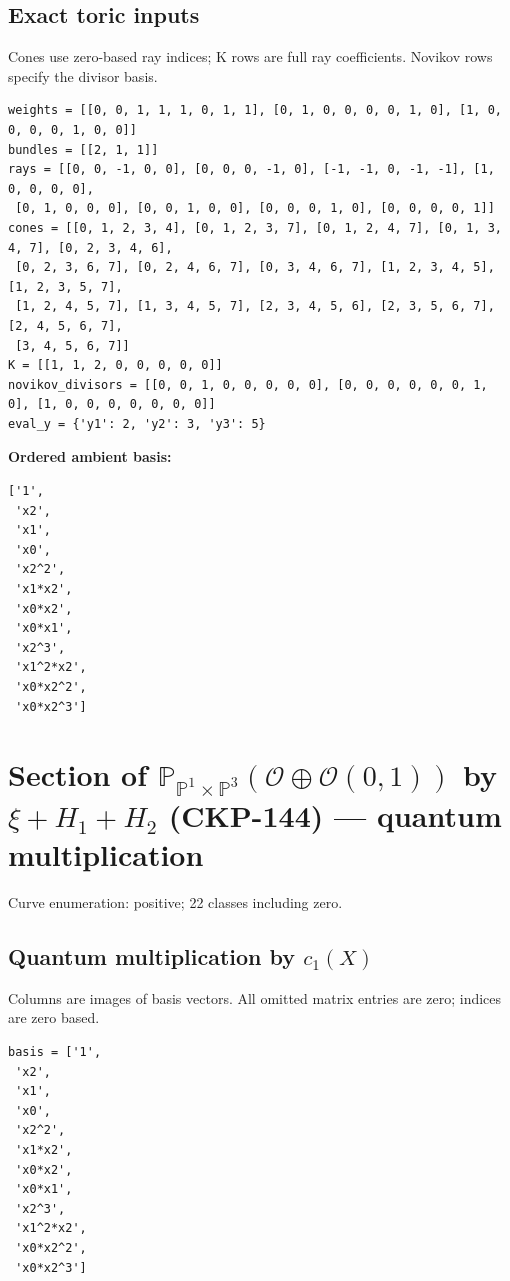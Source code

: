 \documentclass[10pt,a4paper]{article}
\begin{document}
\subsection*{Exact toric inputs}
Cones use zero-based ray indices; K rows are full ray coefficients. Novikov rows specify the divisor basis.

\begin{lstlisting}
weights = [[0, 0, 1, 1, 1, 0, 1, 1], [0, 1, 0, 0, 0, 0, 1, 0], [1, 0, 0, 0, 0, 1, 0, 0]]
bundles = [[2, 1, 1]]
rays = [[0, 0, -1, 0, 0], [0, 0, 0, -1, 0], [-1, -1, 0, -1, -1], [1, 0, 0, 0, 0],
 [0, 1, 0, 0, 0], [0, 0, 1, 0, 0], [0, 0, 0, 1, 0], [0, 0, 0, 0, 1]]
cones = [[0, 1, 2, 3, 4], [0, 1, 2, 3, 7], [0, 1, 2, 4, 7], [0, 1, 3, 4, 7], [0, 2, 3, 4, 6],
 [0, 2, 3, 6, 7], [0, 2, 4, 6, 7], [0, 3, 4, 6, 7], [1, 2, 3, 4, 5], [1, 2, 3, 5, 7],
 [1, 2, 4, 5, 7], [1, 3, 4, 5, 7], [2, 3, 4, 5, 6], [2, 3, 5, 6, 7], [2, 4, 5, 6, 7],
 [3, 4, 5, 6, 7]]
K = [[1, 1, 2, 0, 0, 0, 0, 0]]
novikov_divisors = [[0, 0, 1, 0, 0, 0, 0, 0], [0, 0, 0, 0, 0, 0, 1, 0], [1, 0, 0, 0, 0, 0, 0, 0]]
eval_y = {'y1': 2, 'y2': 3, 'y3': 5}
\end{lstlisting}

\textbf{Ordered ambient basis:}
\begin{lstlisting}
['1',
 'x2',
 'x1',
 'x0',
 'x2^2',
 'x1*x2',
 'x0*x2',
 'x0*x1',
 'x2^3',
 'x1^2*x2',
 'x0*x2^2',
 'x0*x2^3']
\end{lstlisting}

\clearpage\section*{Section of $\mathbb P_{\mathbb P^{1}\times \mathbb P^{3}}(\mathcal O\oplus \mathcal O(0,1))$ by $\xi +H_{1}+H_{2}$ (CKP-144) --- quantum multiplication}

Curve enumeration: positive; 22 classes including zero.
\subsection*{Quantum multiplication by $c_1(X)$}
Columns are images of basis vectors. All omitted matrix entries are zero; indices are zero based.

\begin{lstlisting}
basis = ['1',
 'x2',
 'x1',
 'x0',
 'x2^2',
 'x1*x2',
 'x0*x2',
 'x0*x1',
 'x2^3',
 'x1^2*x2',
 'x0*x2^2',
 'x0*x2^3']
\end{lstlisting}
\end{document}
